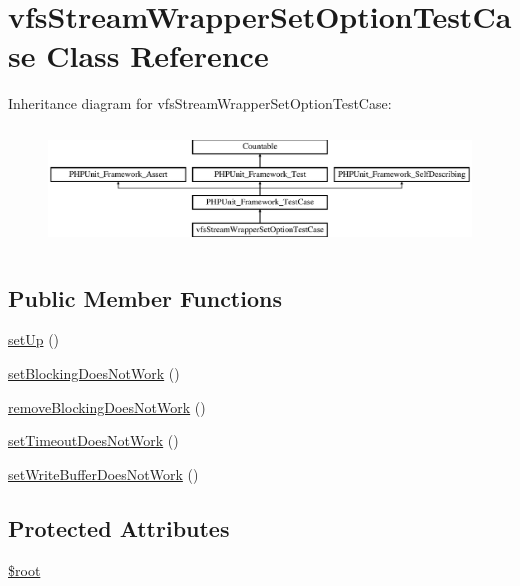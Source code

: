 \hypertarget{classorg_1_1bovigo_1_1vfs_1_1vfs_stream_wrapper_set_option_test_case}{}\section{vfs\+Stream\+Wrapper\+Set\+Option\+Test\+Case Class Reference}
\label{classorg_1_1bovigo_1_1vfs_1_1vfs_stream_wrapper_set_option_test_case}
Inheritance diagram for vfs\+Stream\+Wrapper\+Set\+Option\+Test\+Case\+:\begin{figure}[H]
\begin{center}
\leavevmode
\includegraphics[height=3.218391cm]{classorg_1_1bovigo_1_1vfs_1_1vfs_stream_wrapper_set_option_test_case}
\end{center}
\end{figure}
\subsection*{Public Member Functions}
\begin{DoxyCompactItemize}
\item 
\mbox{\hyperlink{classorg_1_1bovigo_1_1vfs_1_1vfs_stream_wrapper_set_option_test_case_a0bc688732d2b3b162ffebaf7812e78da}{set\+Up}} ()
\item 
\mbox{\hyperlink{classorg_1_1bovigo_1_1vfs_1_1vfs_stream_wrapper_set_option_test_case_a678f9162ed800e07e5b3e6b639bd6a6c}{set\+Blocking\+Does\+Not\+Work}} ()
\item 
\mbox{\hyperlink{classorg_1_1bovigo_1_1vfs_1_1vfs_stream_wrapper_set_option_test_case_a8a0a303faa545ab3495782db5162af6b}{remove\+Blocking\+Does\+Not\+Work}} ()
\item 
\mbox{\hyperlink{classorg_1_1bovigo_1_1vfs_1_1vfs_stream_wrapper_set_option_test_case_a63cc067af6089dc7b4dc5aff6778cb04}{set\+Timeout\+Does\+Not\+Work}} ()
\item 
\mbox{\hyperlink{classorg_1_1bovigo_1_1vfs_1_1vfs_stream_wrapper_set_option_test_case_a2c4d6691244a0432f26b31f3baf3822c}{set\+Write\+Buffer\+Does\+Not\+Work}} ()
\end{DoxyCompactItemize}
\subsection*{Protected Attributes}
\begin{DoxyCompactItemize}
\item 
\mbox{\hyperlink{classorg_1_1bovigo_1_1vfs_1_1vfs_stream_wrapper_set_option_test_case_ab37f7c32f41c3c61ed940887453767f4}{\$root}}
\end{DoxyCompactItemize}
